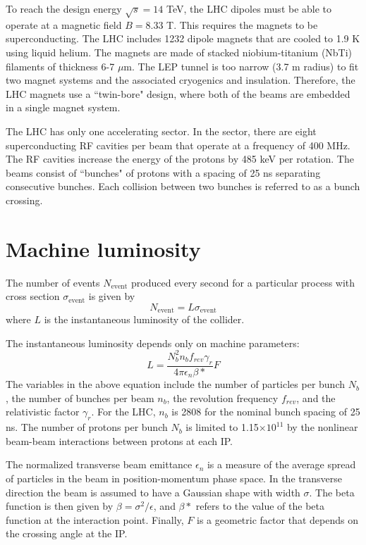 To reach the design energy $\sqrt{s} = 14$ TeV, the LHC dipoles must be able to operate at a magnetic field $B = 8.33$ T. This requires the magnets to be superconducting. The LHC includes 1232 dipole magnets that are cooled to 1.9 K using liquid helium. The magnets are made of stacked niobium-titanium (NbTi) filaments of thickness 6-7 $\mu$m. The LEP tunnel is too narrow (3.7 m radius) to fit two magnet systems and the associated cryogenics and insulation. Therefore, the LHC magnets use a ``twin-bore" design, where both of the beams are embedded in a single magnet system.

The LHC has only one accelerating sector. In the sector, there are eight superconducting RF cavities per beam that operate at a frequency of 400 MHz. The RF cavities increase the energy of the protons by 485 keV per rotation. The beams consist of ``bunches" of protons with a spacing of 25 ns separating consecutive bunches. Each collision between two bunches is referred to as a bunch crossing. 

\section{Machine luminosity}
\label{sec:tunnel}

The number of events $N_{\mathrm{event}}$ produced every second for a particular process with cross section $\sigma_{\mathrm{event}}$ is given by
\begin{equation}
N_{\mathrm{event}} = L\sigma_{\mathrm{event}}
\end{equation}
where $L$ is the instantaneous luminosity of the collider. 

The instantaneous luminosity depends only on machine parameters: 
\begin{equation}
L = \frac{N_b^2 n_b f_{rev} \gamma_r}{4\pi\epsilon_n\beta\ast}F
\end{equation}
The variables in the above equation include the number of particles per bunch $N_b$, the number of bunches per beam $n_b$, the revolution frequency $f_{rev}$, and the relativistic factor $\gamma_r$. For the LHC, $n_b$ is 2808 for the nominal bunch spacing of 25 ns. The number of protons per bunch $N_b$ is limited to 1.15$\times 10^{11}$ by the nonlinear beam-beam interactions between protons at each IP. 

The normalized transverse beam emittance $\epsilon_n$ is a measure of the average spread of particles in the beam in position-momentum phase space. In the transverse direction the beam is assumed to have a Gaussian shape with width $\sigma$. The beta function is then given by $\beta = \sigma^2 /\epsilon$, and $\beta\ast$ refers to the value of the beta function at the interaction point. Finally, $F$ is a geometric factor that depends on the crossing angle at the IP. 

